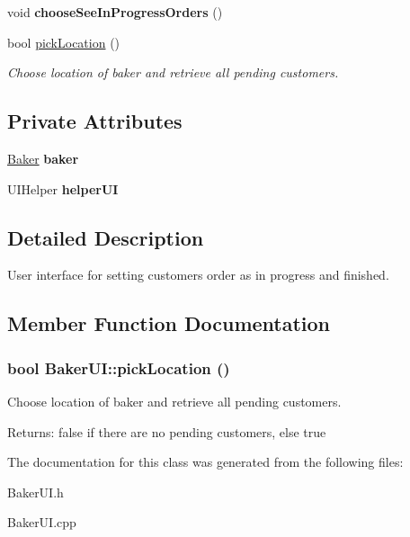 \begin{CompactItemize}
\item 
\hypertarget{class_baker_u_i_8a3e4f702e7acee5575bbbc949c7fa6d}{
void {\bf choose\-See\-In\-Progress\-Orders} ()}
\label{class_baker_u_i_8a3e4f702e7acee5575bbbc949c7fa6d}

\item 
bool \hyperlink{class_baker_u_i_74d0d6b7d7493e8a9703bc8fbeb79f2e}{pick\-Location} ()
\begin{CompactList}\small\item\em Choose location of baker and retrieve all pending customers. \item\end{CompactList}\end{CompactItemize}
\subsection*{Private Attributes}
\begin{CompactItemize}
\item 
\hypertarget{class_baker_u_i_623466d63908ff643b88d946e2f2fbd6}{
\hyperlink{class_baker}{Baker} {\bf baker}}
\label{class_baker_u_i_623466d63908ff643b88d946e2f2fbd6}

\item 
\hypertarget{class_baker_u_i_165ca02db075e280199e0970e3465900}{
UIHelper {\bf helper\-UI}}
\label{class_baker_u_i_165ca02db075e280199e0970e3465900}

\end{CompactItemize}


\subsection{Detailed Description}
User interface for setting customers order as in progress and finished. 



\subsection{Member Function Documentation}
\hypertarget{class_baker_u_i_74d0d6b7d7493e8a9703bc8fbeb79f2e}{
\subsubsection[pickLocation]{\setlength{\rightskip}{0pt plus 5cm}bool Baker\-UI::pick\-Location ()}}
\label{class_baker_u_i_74d0d6b7d7493e8a9703bc8fbeb79f2e}


Choose location of baker and retrieve all pending customers. 

\begin{Desc}
\item[Returns:]false if there are no pending customers, else true \end{Desc}


The documentation for this class was generated from the following files:\begin{CompactItemize}
\item 
Baker\-UI.h\item 
Baker\-UI.cpp\end{CompactItemize}
